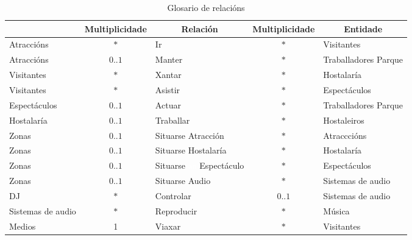 \documentclass[12pt,a4paper]{book}
\theoremstyle{definition}
\theoremstyle{break}
\begin{document}
\newpage

\begin{table} [H] \centering
	\caption{Glosario de relacións}
	\begin{tabular}{|m{2.3cm}|c|m{2.05cm}|c|m{2.4cm}|}
	\hline \rowcolor{gris}
	\multicolumn{1}{|c|}{Entidade} & \multicolumn{1}{c|}{Multiplicidade} & \multicolumn{1}{c|}{Relación} & \multicolumn{1}{c|}{Multiplicidade} & \multicolumn{1}{c|}{Entidade} \\
	\hline
	Atraccións & $*$ & Ir & $*$ & Visitantes \\
	\hline
	Atraccións & $0$..$1$ & Manter & $*$ & Traballadores Parque \\
	\hline
	Visitantes & $*$ & Xantar & $*$ & Hostalaría \\
	\hline
	Visitantes & $*$ & Asistir & $*$ & Espectáculos \\
	\hline
	Espectáculos & $0$..$1$ & Actuar & $*$ & Traballadores Parque \\
	\hline
	Hostalaría & $0$..$1$ & Traballar & $*$ & Hostaleiros \\
	\hline
	Zonas & $0$..$1$ & Situarse Atracción & $*$ & Atracccións\\
	\hline
	Zonas & $0$..$1$ & Situarse Hostalaría & $*$ & Hostalaría\\
	\hline
	Zonas & $0$..$1$ & Situarse \textcolor{white}{aa} Espectáculo & $*$ & Espectáculos\\
	\hline
	Zonas & $0$..$1$ & Situarse Audio & $*$ & Sistemas de audio\\
	\hline
	DJ & $*$ & Controlar & $0$..$1$ & Sistemas de audio\\
	\hline
	Sistemas de audio & $*$ & Reproducir & $*$ & Música\\
	\hline
	Medios & 1 & Viaxar & $*$& Visitantes\\
	\hline
	\end{tabular}
\end{table}


\newpage
\end{document}
